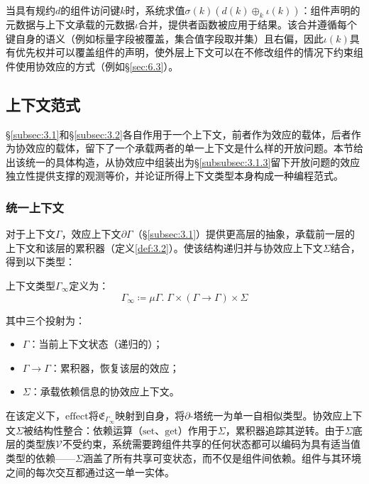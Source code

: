 当具有规约$d$的组件访问键$k$时，系统求值$\sigma(k)(d(k) \oplus_k \iota(k))$：组件声明的元数据与上下文承载的元数据$\iota$合并，提供者函数被应用于结果。该合并遵循每个键自身的语义（例如标量字段被覆盖，集合值字段取并集）且右偏，因此$\iota(k)$具有优先权并可以覆盖组件的声明，使外层上下文可以在不修改组件的情况下约束组件使用协效应的方式（例如\S\ref{sec:6.3}）。

\subsection{上下文范式}\label{subsec:3.3}

\S\ref{subsec:3.1}和\S\ref{subsec:3.2}各自作用于一个上下文，前者作为效应的载体，后者作为协效应的载体，留下了一个承载两者的单一上下文是什么样的开放问题。本节给出该统一的具体构造，从协效应中组装出为\S\ref{subsubsec:3.1.3}留下开放问题的效应独立性提供支撑的观测等价，并论证所得上下文类型本身构成一种编程范式。

\subsubsection{统一上下文}\label{subsubsec:3.3.1}

对于上下文$\Gamma$，效应上下文$\partial\Gamma$（\S\ref{subsec:3.1}）提供更高层的抽象，承载前一层的上下文和该层的累积器（定义\ref{def:3.2}）。使该结构递归并与协效应上下文$\Sigma$结合，得到以下类型：

\begin{definition}\label{def:3.32}
上下文类型$\Gamma_\infty$定义为：
\begin{equation}\label{eq:3.31}
\Gamma_\infty \coloneqq \mu\Gamma.\; \Gamma \times (\Gamma \to \Gamma) \times \Sigma
\end{equation}
\end{definition}

其中三个投射为：
\begin{itemize}
\item $\Gamma$：当前上下文状态（递归的）；
\item $\Gamma \to \Gamma$：累积器，恢复该层的效应；
\item $\Sigma$：承载依赖信息的协效应上下文。
\end{itemize}

在该定义下，$\mathrm{effect}$将$\mathfrak{E}_{\Gamma_\infty}$映射到自身，将$\partial$-塔统一为单一自相似类型。协效应上下文$\Sigma$被结构性整合：依赖运算（$\mathrm{set}$、$\mathrm{get}$）作用于$\Sigma$，累积器追踪其逆转。由于$\Sigma$底层的类型族$\mathcal{V}$不受约束，系统需要跨组件共享的任何状态都可以编码为具有适当值类型的依赖——$\Sigma$涵盖了所有共享可变状态，而不仅是组件间依赖。组件与其环境之间的每次交互都通过这一单一实体。

